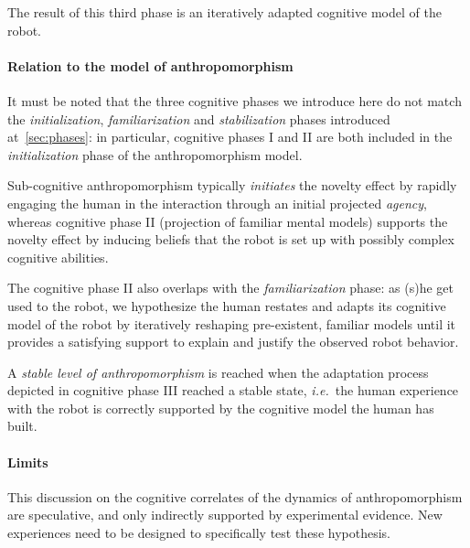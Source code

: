 \documentclass{acm_proc_article-sp}
\newcommand{\ie}{{\textit{i.e.~}}}
\begin{document}
The result of this third phase is an iteratively adapted cognitive model of the
robot.

\paragraph{Relation to the model of anthropomorphism} It must be noted that the
three cognitive phases we introduce here do not match the
\emph{initialization}, \emph{familiarization} and \emph{stabilization} phases
introduced at~\ref{sec:phases}: in particular, cognitive phases I and II are
both included in the \emph{initialization} phase of the anthropomorphism model.

Sub-cognitive anthropomorphism typically \emph{initiates} the novelty effect by
rapidly engaging the human in the interaction through an initial projected
\emph{agency}, whereas cognitive phase II (projection of familiar mental
models) supports the novelty effect by inducing beliefs that the robot is set
up with possibly complex cognitive abilities.

The cognitive phase II also overlaps with the \emph{familiarization} phase: as
(s)he get used to the robot, we hypothesize the human restates and adapts its
cognitive model of the robot by iteratively reshaping pre-existent, familiar
models until it provides a satisfying support to explain and justify the
observed robot behavior.

A \emph{stable level of anthropomorphism} is reached when the adaptation
process depicted in cognitive phase III reached a stable state, \ie the human
experience with the robot is correctly supported by the cognitive model the
human has built.

\paragraph{Limits} This discussion on the cognitive correlates of the dynamics
of anthropomorphism are speculative, and only indirectly supported by
experimental evidence. New experiences need to be designed to specifically test
these hypothesis.

%
%
%
%
%
\end{document}
